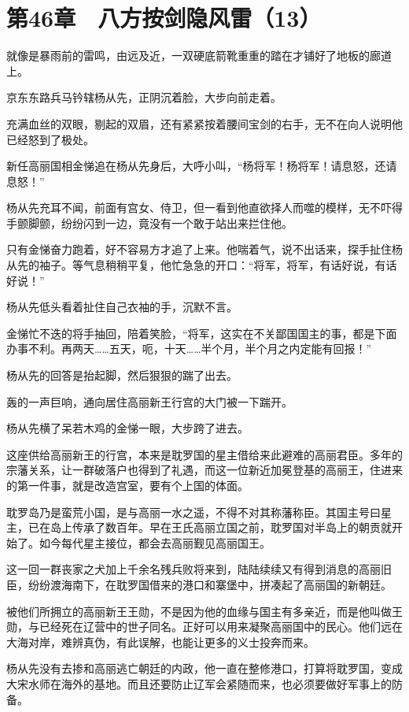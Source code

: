 \section{第46章　八方按剑隐风雷（13）}

就像是暴雨前的雷鸣，由远及近，一双硬底箭靴重重的踏在才铺好了地板的廊道上。

京东东路兵马钤辖杨从先，正阴沉着脸，大步向前走着。

充满血丝的双眼，剔起的双眉，还有紧紧按着腰间宝剑的右手，无不在向人说明他已经怒到了极处。

新任高丽国相金悌追在杨从先身后，大呼小叫，“杨将军！杨将军！请息怒，还请息怒！”

杨从先充耳不闻，前面有宫女、侍卫，但一看到他直欲择人而噬的模样，无不吓得手颤脚颤，纷纷闪到一边，竟没有一个敢于站出来拦住他。

只有金悌奋力跑着，好不容易方才追了上来。他喘着气，说不出话来，探手扯住杨从先的袖子。等气息稍稍平复，他忙急急的开口：“将军，将军，有话好说，有话好说！”

杨从先低头看着扯住自己衣袖的手，沉默不言。

金悌忙不迭的将手抽回，陪着笑脸，“将军，这实在不关鄙国国主的事，都是下面办事不利。再两天……五天，呃，十天……半个月，半个月之内定能有回报！”

杨从先的回答是抬起脚，然后狠狠的踹了出去。

轰的一声巨响，通向居住高丽新王行宫的大门被一下踹开。

杨从先横了呆若木鸡的金悌一眼，大步跨了进去。

这座供给高丽新王的行宫，本来是耽罗国的星主借给来此避难的高丽君臣。多年的宗藩关系，让一群破落户也得到了礼遇，而这一位新近加冕登基的高丽王，住进来的第一件事，就是改造宫室，要有个上国的体面。

耽罗岛乃是蛮荒小国，是与高丽一水之遥，不得不对其称藩称臣。其国主号曰星主，已在岛上传承了数百年。早在王氏高丽立国之前，耽罗国对半岛上的朝贡就开始了。如今每代星主接位，都会去高丽觐见高丽国王。

这一回一群丧家之犬加上千余名残兵败将来到，陆陆续续又有得到消息的高丽旧臣，纷纷渡海南下，在耽罗国借来的港口和寨堡中，拼凑起了高丽国的新朝廷。

被他们所拥立的高丽新王王勋，不是因为他的血缘与国主有多亲近，而是他叫做王勋，与已经死在辽营中的世子同名。正好可以用来凝聚高丽国中的民心。他们远在大海对岸，难辨真伪，有此误解，也能让更多的义士投奔而来。

杨从先没有去掺和高丽逃亡朝廷的内政，他一直在整修港口，打算将耽罗国，变成大宋水师在海外的基地。而且还要防止辽军会紧随而来，也必须要做好军事上的防备。

